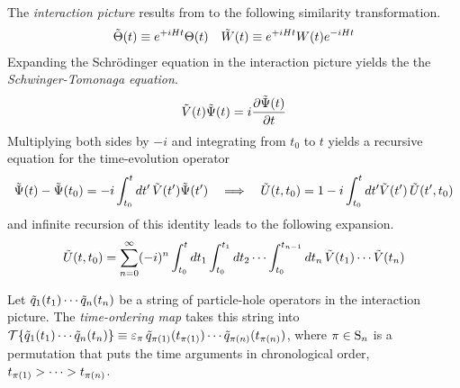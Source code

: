 \documentclass[11pt]{article}
\numberwithin{equation}{section}
\begin{document}
\begin{dfn}
The \textit{interaction picture} results from to the following similarity transformation.
\begin{align}
  \tilde{\Theta }(t)
\equiv
  e^{+iHt}
  \Theta (t)
&&
  \tilde{W}(t)
\equiv
  e^{+iHt}
  W(t)
  e^{-iHt}
\end{align}
Expanding the Schr\"odinger equation in the interaction picture yields the the \textit{Schwinger-Tomonaga equation}.
\begin{align}
\label{eq:schwinger-tomonaga}
  \tilde{V}(t)
  \tilde{\Psi }(t)
=
  i
  \frac {\partial\tilde{\Psi }(t)}{\partial t}
\end{align}
Multiplying both sides by $-i$ and integrating from $t_0$ to $t$ yields a recursive equation for the time-evolution operator
\begin{align}
\label{eq:integrated-schwinger-tomonaga-equation}
  \tilde{\Psi }(t)
-
  \tilde{\Psi }(t_0)
=
-
  i
  \int_{t_0}^t
  dt'\,
  \tilde{V}(t')
  \tilde{\Psi }(t')
&&
\implies
&&
  \tilde{U}(t,t_0)
=
  1
-
  i
  \int_{t_0}^t
  dt'
  \tilde{V}(t')\,
  \tilde{U}(t',t_0)
\end{align}
and infinite recursion of this identity leads to the following expansion.
\begin{align}
\label{eq:time-evolution-infinite-recursion}
  \tilde{U}(t,t_0)
=
  \sum_{n=0}^\infty
  (-i)^n
  \int_{t_0}^t
  dt_1
  \int_{t_0}^{t_1}
  dt_2
  \cdots
  \int_{t_0}^{t_{n-1}}
  dt_n
  \,
  \tilde{V}(t_1)
  \cdots
  \tilde{V}(t_n)
\end{align}
\end{dfn}

\begin{dfn}
\label{dfn:time-ordering}
Let 
$
  \tilde{q}_1(t_1)\cdots \tilde{q}_n(t_n)
$
be a string of particle-hole operators in the interaction picture.\footnotemark
{}
The \textit{time-ordering map} takes this string into
$
  \mc{T}\{
  \tl{q}_1(t_1)\cd \tl{q}_n(t_n)
  \}
\equiv
  \e_\pi \,\tl{q}_{\pi(1)}(t_{\pi(1)})\cd \tl{q}_{\pi(n)}(t_{\pi(n)})
$,
where $\pi\in\mr{S}_n$ is a permutation that puts the time arguments in chronological order, $t_{\pi(1)}>\cd>t_{\pi(n)}$.
\end{dfn}
\end{document}
